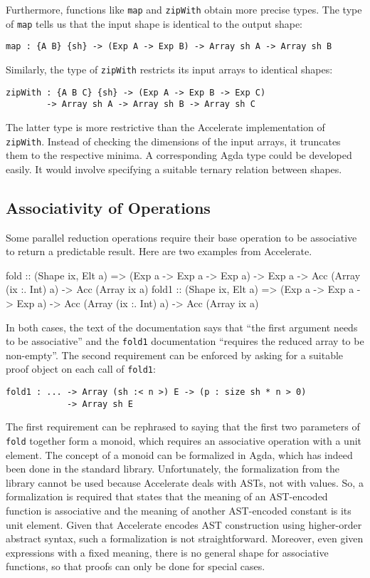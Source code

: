 \documentclass{llncs}
\begin{document}
Furthermore, functions like \texttt{map} and \texttt{zipWith} obtain
more precise types. The type of \texttt{map} tells us that the input
shape is identical to the output shape:
\begin{verbatim}
map : {A B} {sh} -> (Exp A -> Exp B) -> Array sh A -> Array sh B
\end{verbatim}
Similarly, the type of \texttt{zipWith} restricts its input arrays to
identical shapes:
\begin{verbatim}
zipWith : {A B C} {sh} -> (Exp A -> Exp B -> Exp C)
        -> Array sh A -> Array sh B -> Array sh C
\end{verbatim}
The latter type is more restrictive than the Accelerate
implementation of \texttt{zipWith}. Instead of checking the dimensions
of the input arrays, it truncates them to the respective minima. A
corresponding Agda type could be developed easily. It would involve
specifying a suitable ternary relation between shapes.

\subsection{Associativity of Operations}
\label{sec:assoc-oper}

Some parallel reduction operations require their base operation to be
associative to return a predictable result. Here are two examples from
Accelerate. 
\begin{hcode}
fold  :: (Shape ix, Elt a) =>
         (Exp a -> Exp a -> Exp a) -> Exp a ->
         Acc (Array (ix :. Int) a) -> Acc (Array ix a)
fold1 :: (Shape ix, Elt a) =>
         (Exp a -> Exp a -> Exp a) ->
         Acc (Array (ix :. Int) a) -> Acc (Array ix a)
\end{hcode}
In both cases, the text of the documentation says that ``the first
argument needs to be associative'' and the \texttt{fold1}
documentation ``requires the reduced array to be non-empty''.
The second requirement can be enforced by asking for a suitable proof
object on each call of \texttt{fold1}:
\begin{verbatim}
fold1 : ... -> Array (sh :< n >) E -> (p : size sh * n > 0)
            -> Array sh E
\end{verbatim}
The first requirement can be rephrased to saying that the first two
parameters of \texttt{fold} together form a monoid, which requires an
associative operation with a unit element. The concept of a monoid
can be formalized in Agda, which has indeed been done in the standard
library. Unfortunately, the formalization from the library cannot be
used because Accelerate deals with ASTs, not with values. So, a
formalization is required that states that the meaning of an
AST-encoded function is associative and the meaning of another
AST-encoded constant is its unit element. Given that Accelerate
encodes AST construction using higher-order abstract syntax, such a
formalization is not straightforward. Moreover, even given expressions
with a fixed meaning, there is no general shape for associative
functions, so that proofs can only be done for special cases. 
\end{document}
